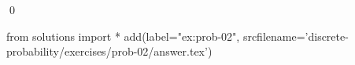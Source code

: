 
\begin{ex} 
  \label{ex:prob-02}
  
  \qed
\end{ex} 
\begin{python0}
from solutions import *
add(label="ex:prob-02",
    srcfilename='discrete-probability/exercises/prob-02/answer.tex') 
\end{python0}
